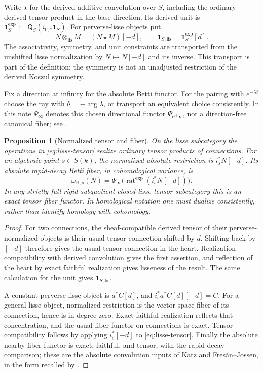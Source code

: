 \documentclass[11pt]{article}
\numberwithin{equation}{section}
\newtheorem{proposition}[proposition]{Proposition}
\theoremstyle{definition}
\theoremstyle{remark}
\newcommand{\rat}{\operatorname{rat}}
\newcommand{\B}{\mathrm B}
\newcommand{\lis}{\mathrm{lis}}
\newcommand{\one}{\mathbf1}
\begin{document}
Write $\star$ for the derived additive convolution over $S$, including the
ordinary derived tensor product in the base direction. Its derived unit is
$\one_S^{\exp}:=\mathsf Q_S(i_{0,*}\one_S)$. For perverse-lisse objects put
\begin{equation}\label{eq:lisse-tensor}
  N\otimes_{\lis}M=(N\star M)[-d],\qquad
  \one_{S,\lis}=\one_S^{\exp}[d].
\end{equation}
The associativity, symmetry, and unit constraints are transported from the
unshifted lisse normalization by $N\mapsto N[-d]$ and its inverse.
This transport is part of the definition; the symmetry is not an
unadjusted restriction of the derived Koszul symmetry.

Fix a direction at infinity for the absolute Betti functor. For the
pairing with $e^{-\lambda t}$ choose the ray with
$\theta=-\arg\lambda$, or transport an equivalent choice consistently.
In this note $\Psi_\infty$ denotes this chosen directional functor
$\Psi_{e^{i\theta}\infty}$, not a direction-free canonical fiber; see
\cite[Definition~3.5 and Theorem~3.6]{Snodgrass}.

\begin{proposition}[Normalized tensor and fiber]\label{prop:normalization}
On the lisse subcategory the operations in \eqref{eq:lisse-tensor} realize
ordinary tensor products of connections. For an algebraic point $s\in S(k)$,
the normalized absolute restriction is $i_s^*N[-d]$. Its absolute
rapid-decay Betti fiber, in cohomological variance, is
\begin{equation}\label{eq:betti-fiber}
  \omega_{\B,s}(N)
  =\Psi_\infty\bigl(\rat^{\exp}(i_s^*N[-d])\bigr).
\end{equation}
In any strictly full rigid subquotient-closed lisse tensor subcategory this
is an exact tensor fiber functor. In homological notation one must dualize
consistently, rather than identify homology with cohomology.
\end{proposition}
\begin{proof}
For two connections, the sheaf-compatible derived tensor of their
perverse-normalized objects is their usual tensor connection shifted by
$d$. Shifting back by $[-d]$ therefore gives the usual tensor connection
in the heart. Realization compatibility with derived convolution gives the
first assertion, and reflection of the heart by exact faithful realization
gives lisseness of the result. The same calculation for the unit gives
$\one_{S,\lis}$.

A constant perverse-lisse object is $a^*C[d]$, and
$i_s^*a^*C[d][-d]=C$. For a general lisse object, normalized restriction
is the vector-space fiber of its connection, hence is in degree zero.
Exact faithful realization reflects that concentration, and the usual
fiber functor on connections is exact. Tensor compatibility follows by
applying $i_s^*[-d]$ to \eqref{eq:lisse-tensor}.
Finally the absolute nearby-fiber functor is exact, faithful, and tensor,
with the rapid-decay comparison; these are the absolute convolution inputs
of Katz and Fres\'an--Jossen, in the form recalled by
\cite[Corollary~2.17 and Theorem~3.6]{Snodgrass}.
\end{proof}
\end{document}
